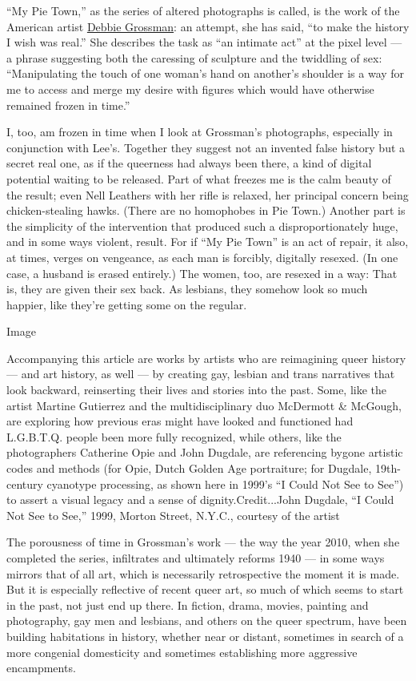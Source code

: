 ``My Pie Town,'' as the series of altered photographs is called, is the
work of the American artist
\href{https://www.debbiegrossman.com/}{Debbie Grossman}: an attempt, she
has said, ``to make the history I wish was real.'' She describes the
task as ``an intimate act'' at the pixel level --- a phrase suggesting
both the caressing of sculpture and the twiddling of sex: ``Manipulating
the touch of one woman's hand on another's shoulder is a way for me to
access and merge my desire with figures which would have otherwise
remained frozen in time.''

I, too, am frozen in time when I look at Grossman's photographs,
especially in conjunction with Lee's. Together they suggest not an
invented false history but a secret real one, as if the queerness had
always been there, a kind of digital potential waiting to be released.
Part of what freezes me is the calm beauty of the result; even Nell
Leathers with her rifle is relaxed, her principal concern being
chicken-stealing hawks. (There are no homophobes in Pie Town.) Another
part is the simplicity of the intervention that produced such a
disproportionately huge, and in some ways violent, result. For if ``My
Pie Town'' is an act of repair, it also, at times, verges on vengeance,
as each man is forcibly, digitally resexed. (In one case, a husband is
erased entirely.) The women, too, are resexed in a way: That is, they
are given their sex back. As lesbians, they somehow look so much
happier, like they're getting some on the regular.

Image

Accompanying this article are works by artists who are reimagining queer
history --- and art history, as well --- by creating gay, lesbian and
trans narratives that look backward, reinserting their lives and stories
into the past. Some, like the artist Martine Gutierrez and the
multidisciplinary duo McDermott \& McGough, are exploring how previous
eras might have looked and functioned had L.G.B.T.Q. people been more
fully recognized, while others, like the photographers Catherine Opie
and John Dugdale, are referencing bygone artistic codes and methods (for
Opie, Dutch Golden Age portraiture; for Dugdale, 19th-century cyanotype
processing, as shown here in 1999's ``I Could Not See to See'') to
assert a visual legacy and a sense of dignity.Credit...John Dugdale, ``I
Could Not See to See,'' 1999, Morton Street, N.Y.C., courtesy of the
artist

The porousness of time in Grossman's work --- the way the year 2010,
when she completed the series, infiltrates and ultimately reforms 1940
--- in some ways mirrors that of all art, which is necessarily
retrospective the moment it is made. But it is especially reflective of
recent queer art, so much of which seems to start in the past, not just
end up there. In fiction, drama, movies, painting and photography, gay
men and lesbians, and others on the queer spectrum, have been building
habitations in history, whether near or distant, sometimes in search of
a more congenial domesticity and sometimes establishing more aggressive
encampments.

